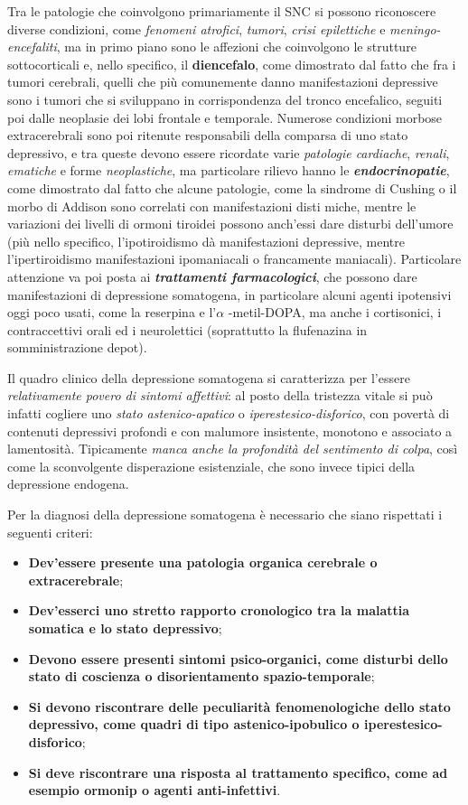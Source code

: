 Tra le patologie che coinvolgono primariamente il SNC si possono
riconoscere diverse condizioni, come \emph{fenomeni atrofici},
\emph{tumori}, \emph{crisi epilettiche} e \emph{meningo-encefaliti}, ma
in primo piano sono le affezioni che coinvolgono le strutture
sottocorticali e, nello specifico, il \textbf{diencefalo}, come
dimostrato dal fatto che fra i tumori cerebrali, quelli che più
comunemente danno manifestazioni depressive sono i tumori che si
sviluppano in corrispondenza del tronco encefalico, seguiti poi dalle
neoplasie dei lobi frontale e temporale. Numerose condizioni morbose
extracerebrali sono poi ritenute responsabili della comparsa di uno
stato depressivo, e tra queste devono essere ricordate varie
\emph{patologie cardiache}, \emph{renali}, \emph{ematiche} e forme
\emph{neoplastiche}, ma particolare rilievo hanno le
\textbf{\emph{endocrinopatie}}, come dimostrato dal fatto che alcune
patologie, come la sindrome di Cushing o il morbo di Addison sono
correlati con manifestazioni disti miche, mentre le variazioni dei
livelli di ormoni tiroidei possono anch'essi dare disturbi dell'umore
(più nello specifico, l'ipotiroidismo dà manifestazioni depressive,
mentre l'ipertiroidismo manifestazioni ipomaniacali o francamente
maniacali). Particolare attenzione va poi posta ai
\textbf{\emph{trattamenti farmacologici}}, che possono dare
manifestazioni di depressione somatogena, in particolare alcuni agenti
ipotensivi oggi poco usati, come la reserpina e l'$\alpha$ -metil-DOPA, ma anche
i cortisonici, i contraccettivi orali ed i neurolettici (soprattutto la
flufenazina in somministrazione depot).

Il quadro clinico della depressione somatogena si caratterizza per
l'essere \emph{relativamente povero di sintomi affettivi}: al posto
della tristezza vitale si può infatti cogliere uno \emph{stato
astenico-apatico} o \emph{iperestesico-disforico}, con povertà di
contenuti depressivi profondi e con malumore insistente, monotono e
associato a lamentosità. Tipicamente \emph{manca anche la profondità del
sentimento di colpa}, così come la sconvolgente disperazione
esistenziale, che sono invece tipici della depressione endogena.

Per la diagnosi della depressione somatogena è necessario che siano
rispettati i seguenti criteri:

\begin{itemize}
\item
  \textbf{Dev'essere presente una patologia organica cerebrale o
  extracerebrale};
\item
  \textbf{Dev'esserci uno stretto rapporto cronologico tra la malattia
  somatica e lo stato depressivo};
\item
  \textbf{Devono essere presenti sintomi psico-organici, come disturbi
  dello stato di coscienza o disorientamento spazio-temporale};
\item
  \textbf{Si devono riscontrare delle peculiarità fenomenologiche dello
  stato depressivo, come quadri di tipo astenico-ipobulico o
  iperestesico-disforico};
\item
  \textbf{Si deve riscontrare una risposta al trattamento specifico,
  come ad esempio ormonip o agenti anti-infettivi}.
\end{itemize}

